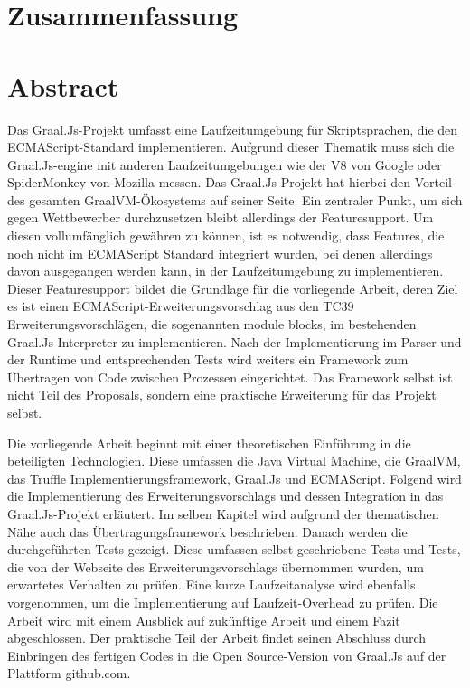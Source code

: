 	{\let\clearpage\relax
	\ifeng	{} \chapter*{Zusammenfassung}
	\else	{} \chapter*{Abstract}
	\fi
		

Das Graal.Js-Projekt umfasst eine Laufzeitumgebung für Skriptsprachen, die den ECMAScript-Standard implementieren. Aufgrund dieser Thematik muss sich die Graal.Js-engine mit anderen Laufzeitumgebungen wie der V8 von Google oder SpiderMonkey von Mozilla messen. Das Graal.Js-Projekt hat hierbei den Vorteil des gesamten GraalVM-Ökosystems auf seiner Seite. Ein zentraler Punkt, um sich gegen Wettbewerber durchzusetzen bleibt allerdings der Featuresupport. Um diesen vollumfänglich gewähren zu können, ist es notwendig, dass Features, die noch nicht im ECMAScript Standard integriert wurden, bei denen allerdings davon ausgegangen werden kann, in der Laufzeitumgebung zu implementieren. Dieser Featuresupport bildet die Grundlage für die vorliegende Arbeit, deren Ziel es ist einen ECMAScript-Erweiterungsvorschlag aus den TC39 Erweiterungsvorschlägen, die sogenannten module blocks, im bestehenden Graal.Js-Interpreter zu implementieren. Nach der Implementierung im Parser und der Runtime und entsprechenden Tests wird weiters ein Framework zum Übertragen von Code zwischen Prozessen eingerichtet. Das Framework selbst ist nicht Teil des Proposals, sondern eine praktische Erweiterung für das Projekt selbst.

Die vorliegende Arbeit beginnt mit einer theoretischen Einführung in die beteiligten Technologien. Diese umfassen die Java Virtual Machine, die GraalVM, das Truffle Implementierungsframework, Graal.Js und ECMAScript. Folgend wird die Implementierung des Erweiterungsvorschlags und dessen Integration in das Graal.Js-Projekt erläutert. Im selben Kapitel wird aufgrund der thematischen Nähe auch das Übertragungsframework beschrieben. Danach werden die durchgeführten Tests gezeigt. Diese umfassen selbst geschriebene Tests und Tests, die von der Webseite des Erweiterungsvorschlags übernommen wurden, um erwartetes Verhalten zu prüfen. Eine kurze Laufzeitanalyse wird ebenfalls vorgenommen, um die Implementierung auf Laufzeit-Overhead zu prüfen. Die Arbeit wird mit einem Ausblick auf zukünftige Arbeit und einem Fazit abgeschlossen. Der praktische Teil der Arbeit findet seinen Abschluss durch Einbringen des fertigen Codes in die Open Source-Version von Graal.Js auf der Plattform github.com.

}
